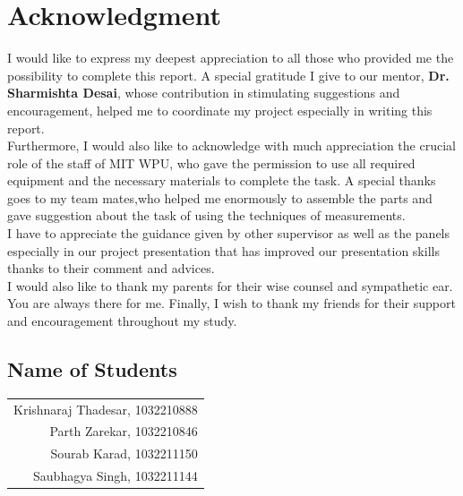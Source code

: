 \documentclass[openany]{report}
\begin{document}


 
\chapter*{Acknowledgment}
\thispagestyle{empty}

I would like to express my deepest appreciation to all those who provided me the possibility to complete this report. A special gratitude I give to our mentor, \textbf{Dr. Sharmishta Desai}, whose contribution in stimulating suggestions and encouragement, helped me to coordinate my project especially in writing this report.\\

Furthermore, I would also like to acknowledge with much appreciation the crucial role of the staff of MIT WPU, who gave the permission to use all required equipment and the necessary materials to complete the task. A special thanks goes to my team mates,who helped me enormously to assemble the parts and gave suggestion about the task of using the techniques of measurements.\\

I have to appreciate the guidance given by other supervisor as well as the panels especially in our project presentation that has improved our presentation skills thanks to their comment and advices.\\

I would also like to thank my parents for their wise counsel and sympathetic ear. You are always there for me. Finally, I wish to thank my friends for their support and encouragement throughout my study.

\vspace{5cm}

\begin{flushright}
    \section*{Name of Students}
    \begin{tabular}{r}
   Krishnaraj Thadesar, 1032210888 \\
   Parth Zarekar, 1032210846 \\
   Sourab Karad, 1032211150 \\
   Saubhagya Singh, 1032211144 \\
    \end{tabular}
    \end{flushright}
    
\end{document}
